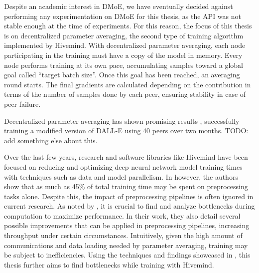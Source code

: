 
Despite an academic interest in DMoE, we have eventually decided against performing any experimentation on DMoE for this thesis, as the API was not stable enough at the time of experiments.
For this reason, the focus of this thesis is on decentralized parameter averaging, the second type of training algorithm implemented by Hivemind.
With decentralized parameter averaging, each node participating in the training must have a copy of the model in memory.
Every node performs training at its own pace, accumulating samples toward a global goal called ``target batch size''.
Once this goal has been reached, an averaging round starts.
The final gradients are calculated depending on the contribution in terms of the number of samples done by each peer, ensuring stability in case of peer failure.

Decentralized parameter averaging has shown promising results \cite{learning30:online}, successfully training a modified version of DALL-E using 40 peers over two months.
TODO: add something else about this.

Over the last few years, research and software libraries like Hivemind have been focused on reducing and optimizing deep neural network model training times with techniques such as data and model parallelism.
In \cite{xin2021production} however, the authors show that as much as 45\% of total training time may be spent on preprocessing tasks alone.
Despite this, the impact of preprocessing pipelines is often ignored in current research.
As noted by \citeauthor{isenko2022bottleneck} \cite{isenko2022bottleneck}, it is crucial to find and analyze bottlenecks during computation to maximize performance.
In their work, they also detail several possible improvements that can be applied in preprocessing pipelines, increasing throughput under certain circumstances.
Intuitively, given the high amount of communications and data loading needed by parameter averaging, training may be subject to inefficiencies.
Using the techniques and findings showcased in \cite{isenko2022bottleneck}, this thesis further aims to find bottlenecks while training with Hivemind.


